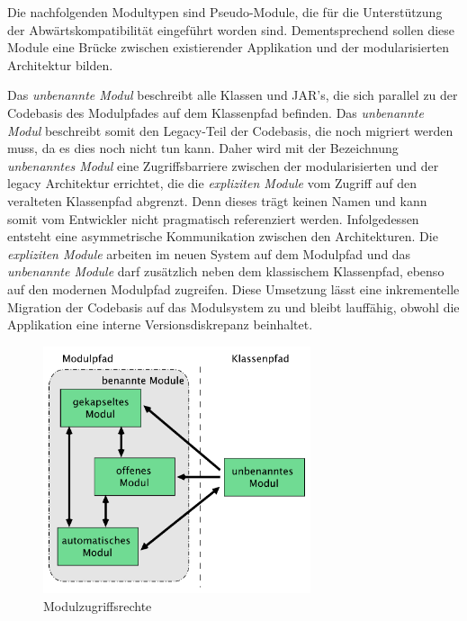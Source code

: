     Die nachfolgenden Modultypen sind Pseudo-Module, die für die Unterstützung der Abwärtskompatibilität eingeführt worden sind. Dementsprechend sollen diese Module eine Brücke zwischen existierender Applikation und der modularisierten Architektur bilden.\bigbreak

    Das \textit{unbenannte Modul} beschreibt alle Klassen und JAR's, die sich parallel zu der Codebasis des Modulpfades auf dem Klassenpfad befinden. Das \textit{unbenannte Modul} beschreibt somit den Legacy-Teil der Codebasis, die noch migriert werden muss, da es dies noch nicht tun kann. Daher wird mit der Bezeichnung \textit{unbenanntes Modul} eine Zugriffsbarriere zwischen der modularisierten und der legacy Architektur errichtet, die die \textit{expliziten Module} vom Zugriff auf den veralteten Klassenpfad abgrenzt. Denn dieses trägt keinen Namen und kann somit vom Entwickler nicht pragmatisch referenziert werden.\newline
    Infolgedessen entsteht eine asymmetrische Kommunikation zwischen den Architekturen. Die \textit{expliziten Module} arbeiten im neuen System auf dem Modulpfad und das \textit{unbenannte Module} darf zusätzlich neben dem klassischem Klassenpfad, ebenso auf den modernen Modulpfad zugreifen. Diese Umsetzung lässt eine inkrementelle Migration der Codebasis auf das Modulsystem zu und bleibt lauffähig, obwohl die Applikation eine interne Versionsdiskrepanz beinhaltet. \cite{modulMitJava9,java9modRevealed,modulProgJava9}

    \begin{figure}[h]
      \centering
      \includegraphics[width=0.7\textwidth]{material/images/module-access.pdf}
      \caption{Modulzugriffsrechte \cite{modulMitJava9}}
      \label{fig:modacc}
    \end{figure}

